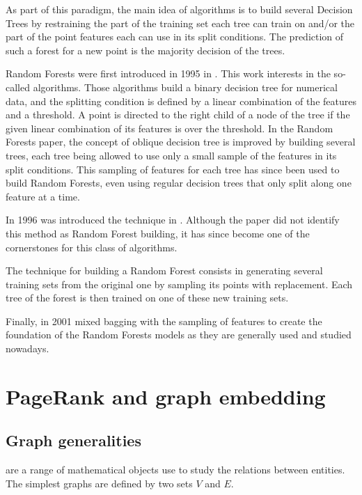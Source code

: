 As part of this paradigm, the main idea of  algorithms is to build several Decision Trees by restraining the part of the training set each tree can train on and/or the part of the point features each can use in its split conditions. The prediction of such a forest for a new point is the majority decision of the trees.

Random Forests were first introduced in 1995 in \cite{ho1995_RandomDecisionForests}. This work interests in the so-called  algorithms. Those algorithms build a binary decision tree for numerical data, and the splitting condition is defined by a linear combination of the features and a threshold. A point is directed to the right child of a node of the tree if the given linear combination of its features is over the threshold. In the Random Forests paper, the concept of oblique decision tree is improved by building several trees, each tree being allowed to use only a small sample of the features in its split conditions. This sampling of features for each tree has since been used to build Random Forests, even using regular decision trees that only split along one feature at a time.

In 1996 was introduced the  technique in \cite{breiman1996_BaggingPredictors}. Although the paper did not identify this method as Random Forest building, it has since become one of the cornerstones for this class of algorithms.

\begin{definition}[Bagging]
    The  technique for building a Random Forest consists in generating several training sets from the original one by sampling its points with replacement. Each tree of the forest is then trained on one of these new training sets.
\end{definition}

Finally, in 2001 \cite{breiman2001_RandomForests} mixed bagging with the sampling of features to create the foundation of the Random Forests models as they are generally used and studied nowadays.

\section{PageRank and graph embedding}

\subsection{Graph generalities}
 are a range of mathematical objects use to study the relations between entities. The simplest graphs are defined by two sets $V$ and $E$. 

